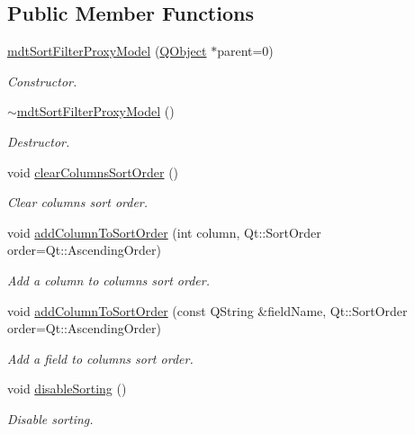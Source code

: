 \subsection*{Public Member Functions}
\begin{DoxyCompactItemize}
\item 
\hyperlink{classmdt_sort_filter_proxy_model_a83bcd157f655c4d675e5a30d97fa16ba}{mdt\-Sort\-Filter\-Proxy\-Model} (\hyperlink{class_q_object}{Q\-Object} $\ast$parent=0)
\begin{DoxyCompactList}\small\item\em Constructor. \end{DoxyCompactList}\item 
\hyperlink{classmdt_sort_filter_proxy_model_a5d1c4647657a13d4b225e790a6b8d1a3}{$\sim$mdt\-Sort\-Filter\-Proxy\-Model} ()
\begin{DoxyCompactList}\small\item\em Destructor. \end{DoxyCompactList}\item 
void \hyperlink{classmdt_sort_filter_proxy_model_aad45b85d23fe3c2eb6198a9eece685d2}{clear\-Columns\-Sort\-Order} ()
\begin{DoxyCompactList}\small\item\em Clear columns sort order. \end{DoxyCompactList}\item 
void \hyperlink{classmdt_sort_filter_proxy_model_a22d0f84ebcc9af078f3c004dbe790fe8}{add\-Column\-To\-Sort\-Order} (int column, Qt\-::\-Sort\-Order order=Qt\-::\-Ascending\-Order)
\begin{DoxyCompactList}\small\item\em Add a column to columns sort order. \end{DoxyCompactList}\item 
void \hyperlink{classmdt_sort_filter_proxy_model_ae447c8f1449b1314fac2448c8b004885}{add\-Column\-To\-Sort\-Order} (const Q\-String \&field\-Name, Qt\-::\-Sort\-Order order=Qt\-::\-Ascending\-Order)
\begin{DoxyCompactList}\small\item\em Add a field to columns sort order. \end{DoxyCompactList}\item 
void \hyperlink{classmdt_sort_filter_proxy_model_adcd8faebb7fb2ccf9f95cbcfea4a1c14}{disable\-Sorting} ()
\begin{DoxyCompactList}\small\item\em Disable sorting. \end{DoxyCompactList}\item 

\end{DoxyCompactItemize}
